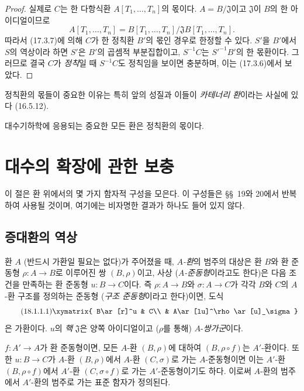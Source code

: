 \begin{proof}
실제로 $C$는 한 다항식환 $A[T_1,\ldots,T_n]$의 몫이다.
$A=B/\mathfrak{J}$이고 $\mathfrak{J}$이 $B$의 한 아이디얼이므로
\[
  A[T_1,\ldots,T_n]
  =B[T_1,\ldots,T_n]/\mathfrak{J}B[T_1,\ldots,T_n].
\]
따라서 (17.3.7)에 의해 $C$가 한 정칙환 $B'$의 몫인 경우로 한정할 수
있다. $S'$을 $B'$에서 $S$의 역상이라 하면 $S'$은 $B'$의 곱셈적
부분집합이고, $S^{-1}C$는 $S'^{-1}B'$의 한 몫환이다. 그러므로 결국
$C$가 \emph{정칙}일 때 $S^{-1}C$도 정칙임을 보이면 충분하며, 이는
(17.3.6)에서 보았다.
\end{proof}

정칙환의 몫들이 중요한 이유는 특히 앞의 성질과 이들이
\emph{카테너리 환}이라는 사실에 있다 (16.5.12).

대수기하학에 응용되는 중요한 모든 환은 정칙환의 몫이다.

\section{대수의 확장에 관한 보충}
\label{section:0.18-fr}

이 절은 환 위에서의 몇 가지 함자적 구성을 모은다. 이 구성들은
\S\S~19와 20에서 반복하여 사용될 것이며, 여기에는 비자명한 결과가
하나도 들어 있지 않다.

\subsection{증대환의 역상}
\label{subsection:0.18.1-fr}

\begin{env}[18.1.1]
\label{0.18.1.1-fr}
환 $A$ (반드시 가환일 필요는 없다)가 주어졌을 때, \emph{$A$-환}의
범주의 대상은 환 $B$와 환 준동형 $\rho:A\to B$로 이루어진 쌍
$(B,\rho)$이고, 사상 (\emph{$A$-준동형}이라고도 한다)은 다음 조건을
만족하는 환 준동형 $u:B\to C$이다. 즉 $\rho:A\to B$와
$\sigma:A\to C$가 각각 $B$와 $C$의 $A$-환 구조를 정의하는
준동형 (\emph{구조 준동형}이라고 한다)이면, 도식
\begin{equation}
\label{0.18.1.1.1-fr}
\tag{18.1.1.1}
  \xymatrix{
    B\ar[r]^u & C\\
    & A\ar[lu]^\rho\ar[u]_\sigma
  }
\end{equation}
은 가환이다. $u$의 \emph{핵} $\mathfrak{J}$은 양쪽 아이디얼이고
($\rho$를 통해) $A$-\emph{쌍가군}이다.

$f:A'\to A$가 환 준동형이면, 모든 $A$-환 $(B,\rho)$에 대하여
$(B,\rho\circ f)$는 $A'$-환이다. 또한 $u:B\to C$가 $A$-환
$(B,\rho)$에서 $A$-환 $(C,\sigma)$로 가는 $A$-준동형이면
이는 $A'$-환 $(B,\rho\circ f)$에서 $A'$-환
$(C,\sigma\circ f)$로 가는 $A'$-준동형이기도 하다. 이로써
$A$-환의 범주에서 $A'$-환의 범주로 가는 표준 함자가 정의된다.
\end{env}

